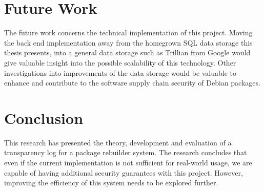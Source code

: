 \documentclass[../Main/thesis.tex]{subfiles}
\begin{document}
\section{Future Work}%
\label{sec:future_work}
The future work concerns the technical implementation of this project.
Moving the back end implementation away from the homegrown SQL data storage this
thesis presents, into a general data storage such as Trillian from Google would
give valuable insight into the possible scalability of this technology. Other
investigations into improvements of the data storage would be valuable to
enhance and contribute to the software supply chain security of Debian packages.

\section{Conclusion}%
\label{sec:conclusion_conclusion}
This research has presented the theory, development and evaluation of a
transparency log for a package rebuilder system. The research concludes that
even if the current implementation is not sufficient for real-world usage, we
are capable of having additional security guarantees with this project. However,
improving the efficiency of this system needs to be explored further.
\end{document}
